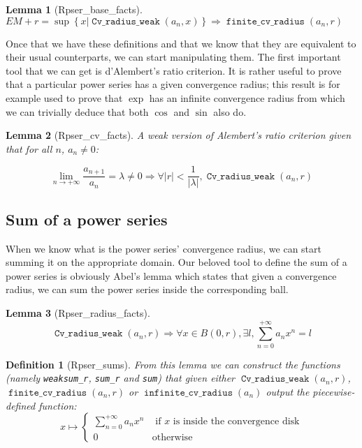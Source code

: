 \documentclass[submission,copyright]{eptcs}
\DeclareMathOperator{\cvrw}{\mathtt{Cv\_radius\_weak}}
\DeclareMathOperator{\fcvr}{\mathtt{finite\_cv\_radius}}
\DeclareMathOperator{\icvr}{\mathtt{infinite\_cv\_radius}}
\newtheorem{definition}{Definition}
\newtheorem{lemma}{Lemma}
\begin{document}
\begin{lemma}[Rpser\_base\_facts] $EM + r = \sup \left\lbrace x |
\cvrw{}(a_n, x) \right\rbrace \Rightarrow \fcvr{}(a_n,r)$ \end{lemma}

Once that we have these definitions and that we know that they are
equivalent to their usual counterparts, we can start manipulating them.
The first important tool that we can get is d'Alembert's ratio criterion.
It is rather useful to prove that a particular power series has a given
convergence radius; this result is for example used to prove that $\exp$
has an infinite convergence radius from which we can trivially deduce
that both $\cos$ and $\sin$ also do.

\begin{lemma}[Rpser\_cv\_facts] A weak version of Alembert's ratio
criterion given that for all $n$, $a_n \neq 0$:

$$\lim\limits_{n \to + \infty}\frac{a_{n+1}}{a_n} = \lambda \neq 0
  \Rightarrow \forall \left| r \right| < \frac{1}{\left| \lambda \right|
  }, \cvrw{}(a_n,r)$$
\end{lemma}

\subsection{Sum of a power series}

When we know what is the power series' convergence radius, we can start
summing it on the appropriate domain. Our beloved tool to define the sum
of a power series is obviously Abel's lemma which states that given a
convergence radius, we can sum the power series inside the corresponding
ball.

\begin{lemma}[Rpser\_radius\_facts] $$\cvrw{}(a_n,r) \Rightarrow
\forall x \in B(0,r), \exists l, \sum_{n=0}^{+\infty} a_n x^n = l$$
\end{lemma}

\begin{definition}[Rpser\_sums] From this lemma we can construct the functions
(namely \texttt{weaksum\_r}, \texttt{sum\_r} and \texttt{sum}) that given either
$\cvrw{}(a_n,r)$, $\fcvr{}(a_n,r)$ or $\icvr{}(a_n)$ output the piecewise-defined
function: $$x \mapsto \left\lbrace
\begin{array}{ll}
\sum_{n=0}^{+\infty} a_n x^n & \text{ if } x \text{ is inside the convergence
disk}\\
0 & \text{otherwise}
\end{array}\right.$$
\end{definition}
\end{document}
